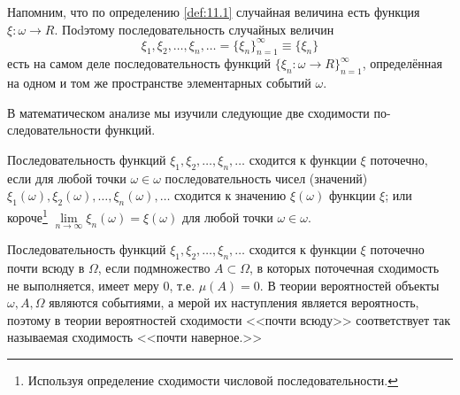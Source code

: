 \begin{zam}
\label{zam:21.1}
Напомним, что по определению \ref{def:11.1} случайная величина
есть функция $ \xi : \omega \to R$. Поdэтому последовательность случайных величин
$$\xi_1, \xi_2,\dots, \xi_n,\dots = \{\xi_n\}_{n=1}^{\infty}\equiv\{\xi_n\}$$
есть на самом деле последовательность функций $\{\xi_n : \omega \to R\}_{n=1}^{\infty}$, определённая на одном и том же пространстве элементарных событий $\omega$.
\end{zam}
В математическом анализе мы изучили следующие две сходимости по-
следовательности функций.

\begin{definition}
\label{def:21.2}
	Последовательность функций $\xi_1, \xi_2,\dots , \xi_n,\dots$ сходится к функции $\xi$ поточечно, если для любой точки $\omega \in \omega$ последовательность чисел (значений) $\xi_1(\omega), \xi_2(\omega),\dots, \xi_n(\omega),\dots$ сходится к значению $\xi(\omega)$ функции $\xi$; или короче\footnote{Используя определение сходимости числовой последовательности.} $\lim\limits_{n\to\infty}\xi_n(\omega) = \xi(\omega)$
	для любой точки $\omega \in \omega$.
\end{definition}

\begin{definition}
\label{def:21.3}
	Последовательность функций $\xi_1, \xi_2,\dots, \xi_n,\dots$ сходится к функции $\xi$ поточечно почти всюду в $\Omega$, если подмножество $A \subset
\Omega$, в которых поточечная сходимость не выполняется, имеет меру 0, т.е.
$\mu(A) = 0$.
В теории вероятностей объекты $\omega, A, \Omega$ являются событиями, а мерой
их наступления является вероятность, поэтому в теории вероятностей
сходимости <<почти всюду>> соответствует так называемая сходимость
<<почти наверное.>>
\end{definition}

